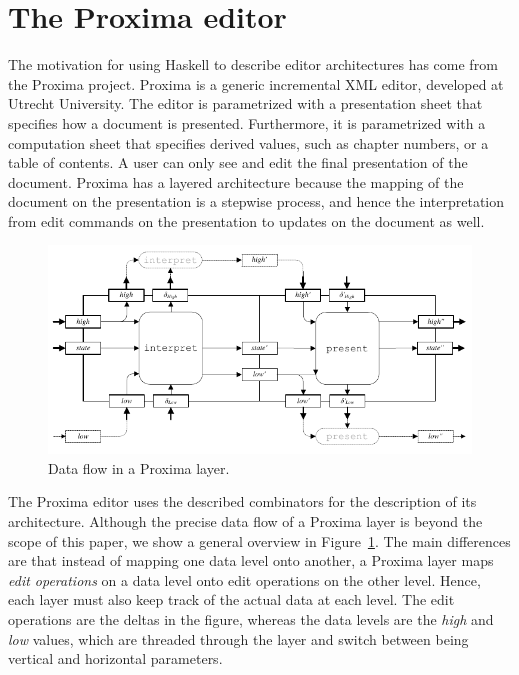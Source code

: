 \documentclass{llncs}
\begin{document}
\ec

		
\section{The Proxima editor} \label{sect:proxima}
The motivation for using Haskell to describe editor architectures has come from the Proxima project. Proxima is a generic incremental XML editor, developed at Utrecht University. The editor is parametrized with a presentation sheet that specifies how a document is presented. Furthermore, it is parametrized with a computation sheet that specifies derived values, such as chapter numbers, or a table of contents. A user can only see and edit the final presentation of the document. Proxima has a layered architecture because the mapping of the document on the presentation is a stepwise process, and hence the interpretation from edit commands on the presentation to updates on the document as well.

\begin{figure}
\includegraphics[width=\columnwidth]{images/LayerDataFlow}
\caption{Data flow in a Proxima layer.} \label{proximaDataFlow}
\end{figure}


The Proxima editor uses the described combinators for the description of its architecture.
Although the precise data flow of a Proxima layer is beyond the scope of this paper, we show a general overview in Figure~\ref{proximaDataFlow}. The main differences are that instead of mapping one data level onto another, a Proxima layer maps {\em edit operations} on a data level onto edit operations on the other level. Hence, each layer must also keep track of the actual data at each level. The edit operations are the deltas in the figure, whereas the data levels are the {\em high} and {\em low} values, which are threaded through the layer and switch between being vertical and horizontal parameters. 
\end{document}
